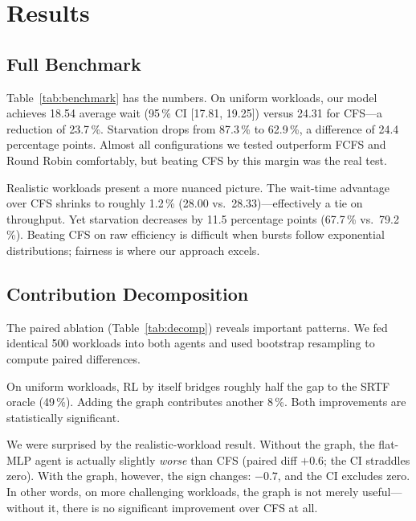 \documentclass[conference]{IEEEtran}
\begin{document}
\section{Results}

\subsection{Full Benchmark}

Table~\ref{tab:benchmark} has the numbers. On uniform workloads, our model
achieves 18.54 average wait (95\,\% CI [17.81, 19.25]) versus 24.31 for
CFS---a reduction of 23.7\,\%. Starvation drops from 87.3\,\% to 62.9\,\%,
a difference of 24.4 percentage points. Almost all configurations we tested
outperform FCFS and Round Robin comfortably, but beating CFS by this margin
was the real test.

Realistic workloads present a more nuanced picture. The wait-time advantage
over CFS shrinks to roughly 1.2\,\% (28.00 vs.\ 28.33)---effectively a tie
on throughput. Yet starvation decreases by 11.5 percentage points
(67.7\,\% vs.\ 79.2\,\%). Beating CFS on raw efficiency is difficult when
bursts follow exponential distributions; fairness is where our approach
excels.

\subsection{Contribution Decomposition}

The paired ablation (Table~\ref{tab:decomp}) reveals important patterns. We
fed identical 500 workloads into both agents and used bootstrap resampling
to compute paired differences.

On uniform workloads, RL by itself bridges roughly half the gap to the SRTF
oracle (49\,\%). Adding the graph contributes another 8\,\%. Both
improvements are statistically significant.

We were surprised by the realistic-workload result. Without the graph, the
flat-MLP agent is actually slightly \emph{worse} than CFS (paired diff
$+0.6$; the CI straddles zero). With the graph, however, the sign changes:
$-0.7$, and the CI excludes zero. In other words, on more challenging
workloads, the graph is not merely useful---without it, there is no
significant improvement over CFS at all.
\end{document}
